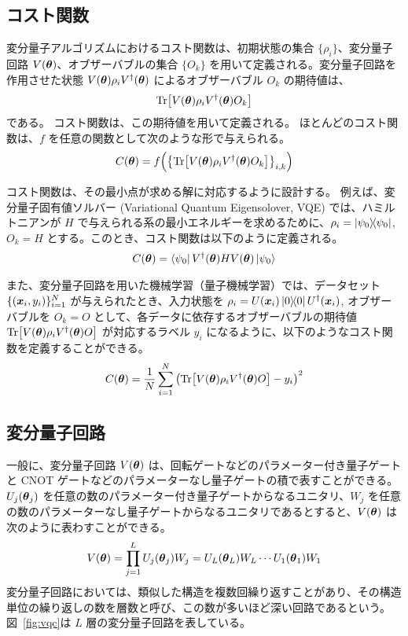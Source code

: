 \subsection{コスト関数}\label{sec:cost}
変分量子アルゴリズムにおけるコスト関数は、初期状態の集合 $\{\rho_i\}$、変分量子回路 $V(\boldsymbol{\theta})$、オブザーバブルの集合 $\{O_k\}$ を用いて定義される。変分量子回路を作用させた状態 $V(\boldsymbol{\theta}) \rho_i V^\dagger(\boldsymbol{\theta})$ によるオブザーバブル $O_k$ の期待値は、
\begin{align}
    \Tr[V(\boldsymbol{\theta}) \rho_i V^\dagger(\boldsymbol{\theta}) O_k]
\end{align}
である。
コスト関数は、この期待値を用いて定義される。
ほとんどのコスト関数は、$f$ を任意の関数として次のような形で与えられる。
\begin{align}\label{eq:cost-general}
    C(\boldsymbol{\theta}) = f\qty(\qty{\Tr[V(\boldsymbol{\theta}) \rho_i V^\dagger(\boldsymbol{\theta}) O_k]}_{i,k})
\end{align}

コスト関数は、その最小点が求める解に対応するように設計する。
例えば、変分量子固有値ソルバー (Variational Quantum Eigensolover, VQE) では、ハミルトニアンが $H$ で与えられる系の最小エネルギーを求めるために、$\rho_i = \dyad{\psi_0}$, $O_k = H$ とする。このとき、コスト関数は以下のように定義される。
\begin{align}\label{eq:cost-vqe}
    C(\boldsymbol{\theta}) = \bra{\psi_0}V^\dagger(\boldsymbol{\theta}) H V(\boldsymbol{\theta})\ket{\psi_0}
\end{align}

また、変分量子回路を用いた機械学習（量子機械学習）では、データセット $\{(\boldsymbol{x}_i, y_i)\}_{i=1}^N$ が与えられたとき、入力状態を $\rho_i = U({\bs{x}_i})\dyad{0}U\dg({\bs{x}_i})$, オブザーバブルを $O_k = O$ として、各データに依存するオブザーバブルの期待値 $\Tr[V(\boldsymbol{\theta}) \rho_i V^\dagger(\boldsymbol{\theta}) O]$ が対応するラベル $y_i$ になるように、以下のようなコスト関数を定義することができる。
\begin{align}\label{eq:cost-qml}
    C(\boldsymbol{\theta}) = \frac1N\sum_{i=1}^N \qty(\Tr[V(\boldsymbol{\theta}) \rho_i V^\dagger(\boldsymbol{\theta}) O] - y_i)^2
\end{align}


\subsection{変分量子回路}
一般に、変分量子回路 $V(\boldsymbol{\theta})$ は、回転ゲートなどのパラメーター付き量子ゲートと CNOT ゲートなどのパラメーターなし量子ゲートの積で表すことができる。$U_j(\boldsymbol{\theta}_j)$ を任意の数のパラメーター付き量子ゲートからなるユニタリ、$W_j$ を任意の数のパラメーターなし量子ゲートからなるユニタリであるとすると、$V(\boldsymbol{\theta})$ は次のように表わすことができる。
\begin{align}
    V(\boldsymbol{\theta})
    = \prod_{j=1}^{L} U_j(\boldsymbol{\theta}_j) W_j
    = U_L(\boldsymbol{\theta}_L)W_L\cdots U_1(\boldsymbol{\theta}_1)W_1
\end{align}
変分量子回路においては、類似した構造を複数回繰り返すことがあり、その構造単位の繰り返しの数を層数と呼び、この数が多いほど深い回路であるという。図~\ref{fig:vqc}は $L$ 層の変分量子回路を表している。

